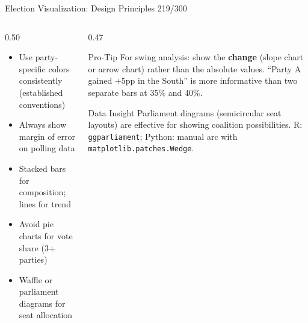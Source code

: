 \documentclass[10pt]{beamer}
\newcommand{\smark}[1]{\hfill{\scriptsize\color{codegray}#1}}
\begin{document}
\begin{frame}{Election Visualization: Design Principles}
\smark{219/300}
\begin{columns}[T]
\begin{column}{0.50\textwidth}
\begin{itemize}
    \item Use party-specific colors consistently (established conventions)
    \item Always show margin of error on polling data
    \item Stacked bars for composition; lines for trend
    \item Avoid pie charts for vote share (3+ parties)
    \item Waffle or parliament diagrams for seat allocation
\end{itemize}
\end{column}
\begin{column}{0.47\textwidth}
\begin{alertblock}{Pro-Tip}
    \scriptsize For swing analysis: show the \textbf{change} (slope chart or arrow chart) rather than the absolute values. ``Party A gained +5pp in the South'' is more informative than two separate bars at 35\% and 40\%.
\end{alertblock}
\vspace{0.1cm}
\begin{exampleblock}{Data Insight}
    \scriptsize Parliament diagrams (semicircular seat layouts) are effective for showing coalition possibilities. R: \texttt{ggparliament}; Python: manual arc with \texttt{matplotlib.patches.Wedge}.
\end{exampleblock}
\end{column}
\end{columns}
\end{frame}
\end{document}
